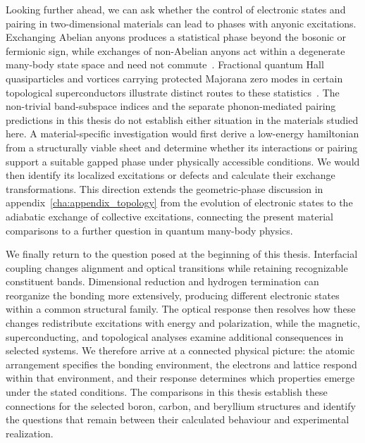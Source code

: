 Looking further ahead, we can ask whether the control of electronic states and pairing in two-dimensional materials can lead to phases with anyonic excitations.
Exchanging Abelian anyons produces a statistical phase beyond the bosonic or fermionic sign, while exchanges of non-Abelian anyons act within a degenerate many-body state space and need not commute~\cite{simon2023topological}.
Fractional quantum Hall quasiparticles and vortices carrying protected Majorana zero modes in certain topological superconductors illustrate distinct routes to these statistics~\cite{arovas1984fractional,ivanov2001nonabelian}.
The non-trivial band-subspace indices and the separate phonon-mediated pairing predictions in this thesis do not establish either situation in the materials studied here.
A material-specific investigation would first derive a low-energy hamiltonian from a structurally viable sheet and determine whether its interactions or pairing support a suitable gapped phase under physically accessible conditions.
We would then identify its localized excitations or defects and calculate their exchange transformations.
This direction extends the geometric-phase discussion in appendix~\ref{cha:appendix_topology} from the evolution of electronic states to the adiabatic exchange of collective excitations, connecting the present material comparisons to a further question in quantum many-body physics.

We finally return to the question posed at the beginning of this thesis.
Interfacial coupling changes alignment and optical transitions while retaining recognizable constituent bands.
Dimensional reduction and hydrogen termination can reorganize the bonding more extensively, producing different electronic states within a common structural family.
The optical response then resolves how these changes redistribute excitations with energy and polarization, while the magnetic, superconducting, and topological analyses examine additional consequences in selected systems.
We therefore arrive at a connected physical picture: the atomic arrangement specifies the bonding environment, the electrons and lattice respond within that environment, and their response determines which properties emerge under the stated conditions.
The comparisons in this thesis establish these connections for the selected boron, carbon, and beryllium structures and identify the questions that remain between their calculated behaviour and experimental realization.
